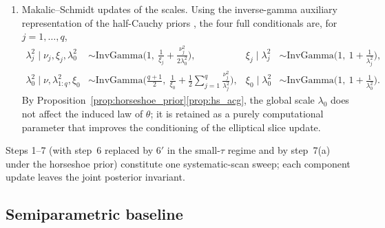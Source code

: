 \documentclass[11pt]{article}
\theoremstyle{definition}
\theoremstyle{plain}
\begin{document}
\begin{enumerate}[leftmargin=*,nosep]
\begin{enumerate}[label=(\alph*),nosep]
\item Makalic--Schmidt updates of the scales. Using the inverse-gamma auxiliary representation of the half-Cauchy priors \citep{MakalicSchmidt2016}, the four full conditionals are, for $j=1,\dots,q$,
\begin{align*}
\lambda_j^2\mid\nu_j,\xi_j,\lambda_0^2 &\sim \mathrm{InvGamma}\!\Big(1,\ \frac{1}{\xi_j}+\frac{\nu_j^2}{2\lambda_0^2}\Big),
&
\xi_j\mid\lambda_j^2 &\sim \mathrm{InvGamma}\!\Big(1,\ 1+\frac{1}{\lambda_j^2}\Big),
\\
\lambda_0^2\mid\nu,\lambda_{1:q}^2,\xi_0 &\sim \mathrm{InvGamma}\!\Big(\frac{q+1}{2},\ \frac{1}{\xi_0}+\frac12\sum_{j=1}^q\frac{\nu_j^2}{\lambda_j^2}\Big),
&
\xi_0\mid\lambda_0^2 &\sim \mathrm{InvGamma}\!\Big(1,\ 1+\frac{1}{\lambda_0^2}\Big).
\end{align*}
By Proposition~\ref{prop:horseshoe_prior}\ref{prop:hs_acg}, the global scale $\lambda_0$ does not affect the induced law of $\theta$; it is retained as a purely computational parameter that improves the conditioning of the elliptical slice update.
\end{enumerate}
\end{enumerate}
Steps 1--7 (with step~6 replaced by 6$'$ in the small-$\tau$ regime and by step~7(a) under the horseshoe prior) constitute one systematic-scan sweep; each component update leaves the joint posterior invariant.

\subsection{Semiparametric baseline}
\label{sec:semiparametric}
\end{document}

